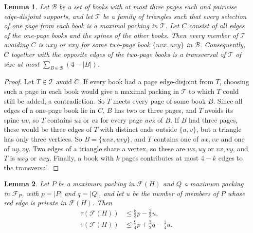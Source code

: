 \documentclass[11pt]{article}
\newtheorem{lemma}{Lemma}[section]
\theoremstyle{remark}
\newcommand{\F}{\mathcal F}
\begin{document}
\begin{lemma}\label{lem:books}
Let $\mathcal B$ be a set of books with at most three pages each and pairwise edge-disjoint supports, and let $\mathcal T$ be a family of triangles such that every selection of one page from each book is a maximal packing in $\mathcal T$. Let $C$ consist of all edges of the one-page books and the spines of the other books. Then every member of $\mathcal T$ avoiding $C$ is $uxy$ or $vxy$ for some two-page book $\{uvx,uvy\}$ in $\mathcal B$. Consequently, $C$ together with the opposite edges of the two-page books is a transversal of $\mathcal T$ of size at most $\sum_{B\in\mathcal B}(4-|B|)$.
\end{lemma}

\begin{proof}
Let $T\in\mathcal T$ avoid $C$. If every book had a page edge-disjoint from $T$, choosing such a page in each book would give a maximal packing in $\mathcal T$ to which $T$ could still be added, a contradiction. So $T$ meets every page of some book $B$. Since all edges of a one-page book lie in $C$, $B$ has two or three pages, and $T$ avoids its spine $uv$, so $T$ contains $uz$ or $vz$ for every page $uvz$ of $B$. If $B$ had three pages, these would be three edges of $T$ with distinct ends outside $\{u,v\}$, but a triangle has only three vertices. So $B=\{uvx,uvy\}$, and $T$ contains one of $ux,vx$ and one of $uy,vy$. Two edges of a triangle share a vertex, so these are $ux,uy$ or $vx,vy$, and $T$ is $uxy$ or $vxy$. Finally, a book with $k$ pages contributes at most $4-k$ edges to the transversal.
\end{proof}

\begin{lemma}\label{lem:colored}
Let $P$ be a maximum packing in $\F(H)$ and $Q$ a maximum packing in $\F_P$, with $p=|P|$ and $q=|Q|$, and let $u$ be the number of members of $P$ whose red edge is private in $\F(H)$. Then
\begin{align}
 \tau(\F(H))&\le\tfrac83p-\tfrac23u,\label{eq:colored-bound}\\
 \tau(\F(H))&\le\tfrac94p+\tfrac32q-\tfrac14u.\label{eq:colored-refined}
\end{align}
\end{lemma}
\end{document}
